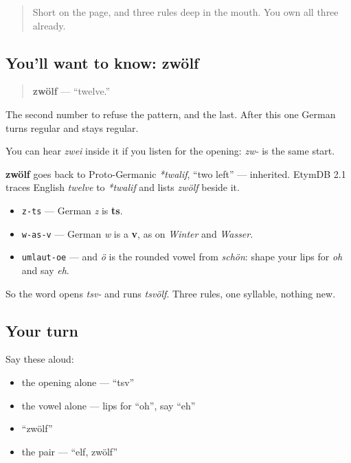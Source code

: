 \begin{quote}
Short on the page, and three rules deep in the mouth. You own all three already.
\end{quote}

\subsection*{You'll want to know: zwölf}
\begin{quote}
\textbf{zwölf} — \textquotedblleft{}twelve.\textquotedblright{}
\end{quote}

The second number to refuse the pattern, and the last. After this one German turns regular and stays regular.

You can hear \emph{zwei} inside it if you listen for the opening: \emph{zw-} is the same start.

\begin{cousinweb}
\textbf{zwölf} goes back to Proto-Germanic \emph{*twalif}, \textquotedblleft{}two left\textquotedblright{} — inherited. EtymDB 2.1 traces English \emph{twelve} to \emph{*twalif} and lists \emph{zwölf} beside it.
\end{cousinweb}

\begin{sounds}
\begin{itemize}
\raggedright
  \item \texttt{z-ts} — German \emph{z} is \textbf{ts}.
  \item \texttt{w-as-v} — German \emph{w} is a \textbf{v}, as on \emph{Winter} and \emph{Wasser}.
  \item \texttt{umlaut-oe} — and \emph{ö} is the rounded vowel from \emph{schön}: shape your lips for \emph{oh} and say \emph{eh}.
\end{itemize}

So the word opens \emph{tsv-} and runs \emph{tsvölf}. Three rules, one syllable, nothing new.
\end{sounds}

\subsection*{Your turn}
Say these aloud:

\begin{itemize}
\raggedright
  \item the opening alone — \textquotedblleft{}tsv\textquotedblright{}
  \item the vowel alone — lips for \textquotedblleft{}oh\textquotedblright{}, say \textquotedblleft{}eh\textquotedblright{}
  \item \textquotedblleft{}zwölf\textquotedblright{}
  \item the pair — \textquotedblleft{}elf, zwölf\textquotedblright{}
\end{itemize}

